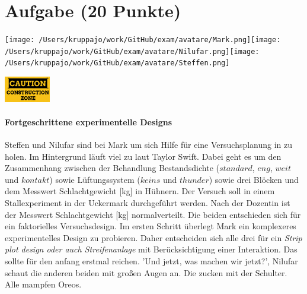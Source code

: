 \documentclass[a4paper, 9pt]{scrartcl}\usepackage[]{graphicx}\usepackage[]{xcolor}
\begin{document}
 
\clearpage

\section{Aufgabe \hfill (20 Punkte)}


 
\begin{minipage}[t]{0.5\textwidth}
\texttt{[image: /Users/kruppajo/work/GitHub/exam/avatare/Mark.png]}\hspace{-4mm}\texttt{[image: /Users/kruppajo/work/GitHub/exam/avatare/Nilufar.png]}\hspace{-4mm}\texttt{[image: /Users/kruppajo/work/GitHub/exam/avatare/Steffen.png]}
\end{minipage}
\begin{minipage}[t]{0.5\textwidth}
\hfill
\href{https://youtu.be/wJqsNV1hOW8}{\includegraphics[width = 2cm]{img/caution}}
\end{minipage}



\paragraph{Fortgeschrittene experimentelle Designs}

Steffen und Nilufar sind bei Mark um sich Hilfe für eine Versuchsplanung in \Rlogo zu holen. Im Hintergrund läuft viel zu laut Taylor Swift. Dabei geht es um den Zusammenhang zwischen der Behandlung Bestandsdichte ($standard$, $eng$, $weit$ und $kontakt$) sowie Lüftungssystem ($keins$ und $thunder$) sowie drei Blöcken und dem Messwert Schlachtgewicht [kg] in Hühnern. Der Versuch soll in einem Stallexperiment in der Uckermark durchgeführt werden. Nach der Dozentin ist der Messwert Schlachtgewicht [kg] normalverteilt. Die beiden entschieden sich für ein faktorielles Versuchsdesign. Im ersten Schritt überlegt Mark ein komplexeres experimentelles Design zu probieren. Daher entscheiden sich alle drei für ein \textit{Strip plot design oder auch Streifenanlage} mit Berücksichtigung einer Interaktion. Das sollte für den anfang erstmal reichen. 'Und jetzt, was machen wir jetzt?', Nilufar schaut die anderen beiden mit großen Augen an. Die zucken mit der Schulter. Alle mampfen Oreos.\\
\end{document}
